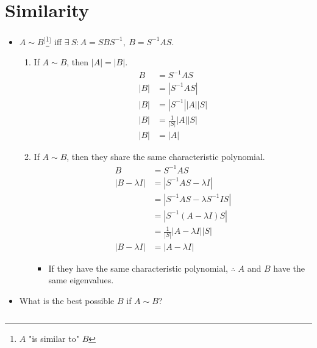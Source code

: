 \documentclass{article}
\begin{document}
\section*{Similarity}
\begin{itemize}
    \item {}$A\sim B$$^[$\footnote{$A$ "is similar to" $B$}$^]$ iff $\exists\ S:A=SBS^{-1},\ B=S^{-1}AS$.
    \begin{enumerate}
        \item If $A\sim B$, then $|A|=|B|$.
        \begin{align*}
            B &= S^{-1}AS\\
            |B| &= |S^{-1}AS|\\
            |B| &= |S^{-1}||A||S|\\
            |B| &= \frac{1}{|S|}|A||S|\\
            |B| &= |A|
        \end{align*}
        \item If $A\sim B$, then they share the same characteristic polynomial.
        \begin{align*}
            B &= S^{-1}AS\\
            |B-\lambda I| &= |S^{-1}AS-\lambda I|\\
            &= |S^{-1}AS-\lambda S^{-1}IS|\\
            &= |S^{-1}(A-\lambda I)S|\\
            &= \frac{1}{|S|}|A-\lambda I||S|\\
            |B-\lambda I| &= |A-\lambda I|
        \end{align*}
        \begin{itemize}
            \item If they have the same characteristic polynomial, $\therefore$ $A$ and $B$ have the same eigenvalues.
        \end{itemize}
    \end{enumerate}
    \item What is the best possible $B$ if $A\sim B$?
    $$
\end{itemize}
\end{document}

